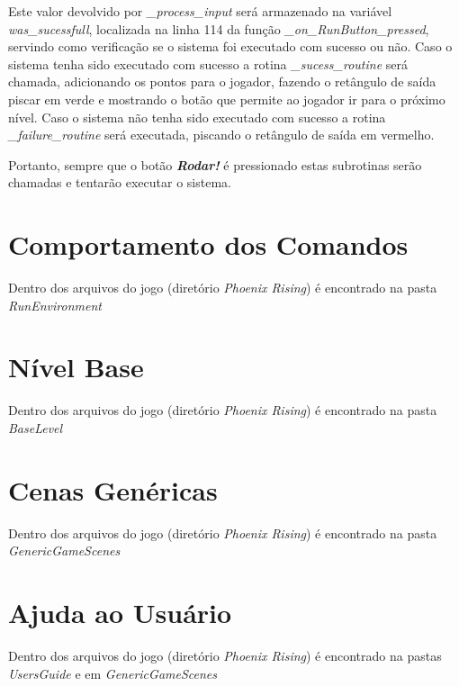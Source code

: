 Este valor devolvido por \textit{\_process\_input} será armazenado na variável 
\textit{was\_sucessfull}, localizada na linha 114 da função 
\textit{\_on\_RunButton\_pressed}, servindo como verificação se o sistema foi 
executado com sucesso ou não. Caso o sistema tenha sido executado com sucesso a
rotina \textit{\_sucess\_routine} será chamada, adicionando os pontos para o
jogador, fazendo o retângulo de saída piscar em verde e mostrando o botão que 
permite ao jogador ir para o próximo nível. Caso o sistema não tenha sido 
executado com sucesso a rotina \textit{\_failure\_routine} será executada,
piscando o retângulo de saída em vermelho.

Portanto, sempre que o botão \textbf{\textit{Rodar!}} é pressionado estas 
subrotinas serão chamadas e tentarão executar o sistema.

\section{Comportamento dos Comandos}

Dentro dos arquivos do jogo (diretório \textit{Phoenix Rising}) é encontrado na
pasta \textit{RunEnvironment}

\section{Nível Base}

Dentro dos arquivos do jogo (diretório \textit{Phoenix Rising}) é encontrado na
pasta \textit{BaseLevel}

\section{Cenas Genéricas}

Dentro dos arquivos do jogo (diretório \textit{Phoenix Rising}) é encontrado na
pasta \textit{GenericGameScenes}

\section{Ajuda ao Usuário}

Dentro dos arquivos do jogo (diretório \textit{Phoenix Rising}) é encontrado na
pastas \textit{UsersGuide} e em \textit{GenericGameScenes} 



